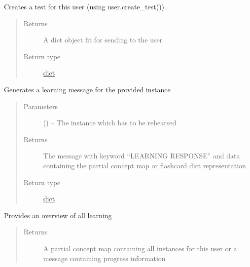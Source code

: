 \documentclass[letterpaper,10pt,english]{sphinxmanual}
\begin{document}
\begin{fulllineitems}

\begin{fulllineitems}
\label{\detokenize{consumer:consumer.Consumer.create_test}}
Creates a test for this user (using user.create\_test())
\begin{quote}\begin{description}
\item[{Returns}] \leavevmode
A dict object fit for sending to the user

\item[{Return type}] \leavevmode
\href{https://docs.python.org/2/library/stdtypes.html\#dict}{dict}

\end{description}\end{quote}

\end{fulllineitems}


\begin{fulllineitems}
\label{\detokenize{consumer:consumer.Consumer.learning_message}}
Generates a learning message for the provided instance
\begin{quote}\begin{description}
\item[{Parameters}] \leavevmode
{} ({\hyperref[\detokenize{instance:instance.Instance}]{}}) -- The instance which has to be rehearsed

\item[{Returns}] \leavevmode
The message with keyword ``LEARNING RESPONSE'' and data containing the partial concept map or flashcard dict representation

\item[{Return type}] \leavevmode
\href{https://docs.python.org/2/library/stdtypes.html\#dict}{dict}

\end{description}\end{quote}

\end{fulllineitems}


\begin{fulllineitems}
\label{\detokenize{consumer:consumer.Consumer.provide_learned_items}}
Provides an overview of all learning
\begin{quote}\begin{description}
\item[{Returns}] \leavevmode
A partial concept map containing all instances for this user or a message containing progress information


\end{description}
\end{quote}
\end{fulllineitems}
\end{fulllineitems}
\end{document}
